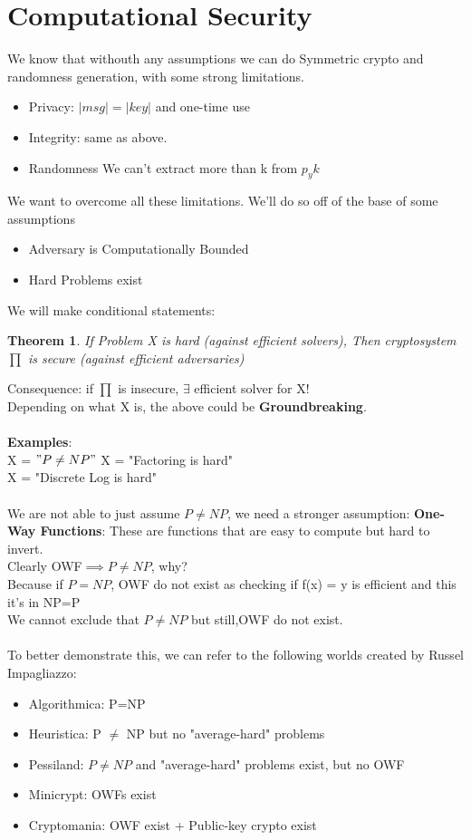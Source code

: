 \documentclass[11pt, a4paper]{article}
\newtheorem{thm}{Theorem}
\begin{document}
\section{Computational Security}
We know that withouth any assumptions we can do Symmetric crypto and randomness generation, with some strong limitations.\\
\begin{itemize}
    \item Privacy: $|msg| = |key|$ and one-time use
    \item Integrity: same as above.
    \item Randomness We can't extract more than k from $p_y k$
\end{itemize}
We want to overcome all these limitations. We'll do so off of the base of some assumptions
\begin{itemize}
    \item Adversary is Computationally Bounded
    \item Hard Problems exist
\end{itemize}
We will make conditional statements:
\begin{thm}
    If Problem X is hard (against efficient solvers), Then cryptosystem $\prod$ is secure (against efficient adversaries)
\end{thm}
Consequence: if $\prod$ is insecure, $\exists$ efficient solver for X!\\
Depending on what X is, the above could be \textbf{Groundbreaking}.\\\\
\textbf{Examples}:\\
X = $"P \neq NP"$
X = "Factoring is hard"\\
X = "Discrete Log is hard"\\\\
We are not able to just assume $P \neq NP$, we need a stronger assumption:
\textbf{One-Way Functions}: These are functions that are easy to compute but hard to invert.\\
Clearly OWF$ \implies P \neq NP$, why?\\
Because if $P=NP$, OWF do not exist as checking if f(x) = y is efficient and this it's in NP=P\\
We cannot exclude that $P \neq NP$ but still,OWF do not exist.\\\\
To better demonstrate this, we can refer to the following worlds created by Russel Impagliazzo:
\begin{itemize}
    \item Algorithmica: P=NP
    \item Heuristica: P $\neq$ NP but no "average-hard" problems
    \item Pessiland: $P\neq NP$ and "average-hard" problems exist, but no OWF
    \item Minicrypt: OWFs exist
    \item Cryptomania: OWF exist + Public-key crypto exist
\end{itemize}
\end{document}

